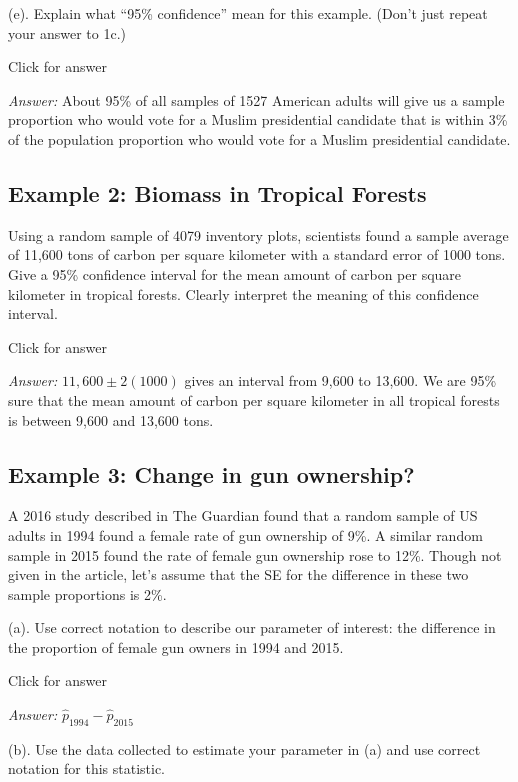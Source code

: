 \documentclass[
]{book}
\begin{document}
(e). Explain what ``95\% confidence'' mean for this example. (Don't just repeat your answer to 1c.)

Click for answer

\emph{Answer:} About 95\% of all samples of 1527 American adults will give us a sample proportion who would vote for a Muslim presidential candidate that is within 3\% of the population proportion who would vote for a Muslim presidential candidate.

\hypertarget{example-2-biomass-in-tropical-forests}{%
\subsection{Example 2: Biomass in Tropical Forests}\label{example-2-biomass-in-tropical-forests}}

Using a random sample of 4079 inventory plots, scientists found a sample average of 11,600 tons of carbon per square kilometer with a standard error of 1000 tons. Give a 95\% confidence interval for the mean amount of carbon per square kilometer in tropical forests. Clearly interpret the meaning of this confidence interval.

Click for answer

\emph{Answer:} \(11,600 \pm 2(1000)\) gives an interval from 9,600 to 13,600. We are 95\% sure that the mean amount of carbon per square kilometer in all tropical forests is between 9,600 and 13,600 tons.

\hypertarget{example-3-change-in-gun-ownership}{%
\subsection{Example 3: Change in gun ownership?}\label{example-3-change-in-gun-ownership}}

A 2016 study described in The Guardian found that a random sample of US adults in 1994 found a female rate of gun ownership of 9\%. A similar random sample in 2015 found the rate of female gun ownership rose to 12\%. Though not given in the article, let's assume that the SE for the difference in these two sample proportions is 2\%.

(a). Use correct notation to describe our parameter of interest: the difference in the proportion of female gun owners in 1994 and 2015.

Click for answer

\emph{Answer:} \(\hat{p}_{1994} - \hat{p}_{2015}\)

(b). Use the data collected to estimate your parameter in (a) and use correct notation for this statistic.
\end{document}
